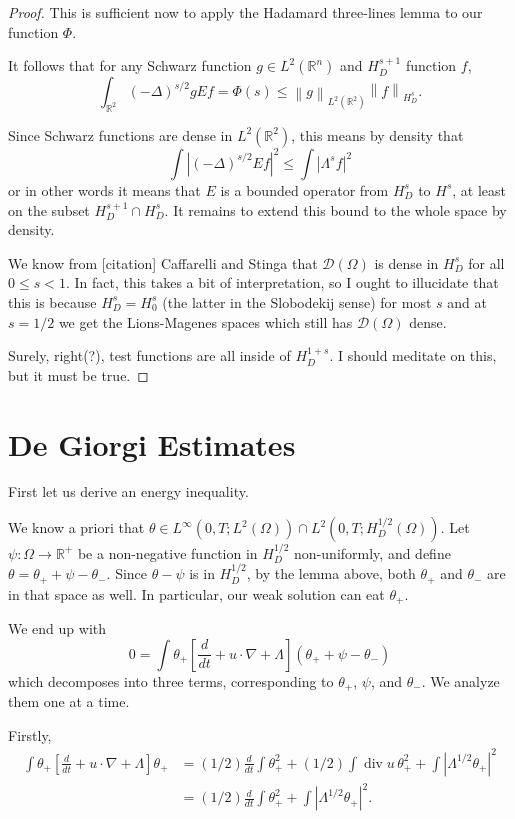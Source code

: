\documentclass[11pt]{amsart}
\theoremstyle{remark}
\newcommand{\R}{\mathbb{R}}
\newcommand{\norm}[1]{\left\lVert#1\right\rVert}
\newcommand{\paren}[1]{\left( #1 \right)}
\newcommand{\bracket}[1]{\left[ #1 \right]}
\newcommand{\abs}[1]{\left\lvert #1 \right\rvert}
\newcommand{\grad}{\nabla}
\newcommand{\ddt}{\frac{d}{dt}}
\renewcommand{\div}{\operatorname{div}}
\newcommand{\Laplace}{\Delta}
\newcommand{\test}{\mathcal{D}}
\begin{document}
\begin{proof}
This is sufficient now to apply the Hadamard three-lines lemma to our function $\Phi$.  

It follows that for any Schwarz function $g \in L^2(\R^n)$ and $H_D^{s+1}$ function $f$, 
\[ \int_{\R^2} \paren{-\Laplace}^{s/2} g E f = \Phi(s) \leq \norm{g}_{L^2(\R^2)} \norm{f}_{H_D^s}. \]

Since Schwarz functions are dense in $L^2(\R^2)$, this means by density that 
\[ \int \abs{ \paren{-\Laplace}^{s/2} E f }^2 \leq \int \abs{\Lambda^s f}^2 \]
or in other words it means that $E$ is a bounded operator from $H_D^s$ to $H^s$, at least on the subset $H_D^{s+1} \cap H_D^s$.  It remains to extend this bound to the whole space by density.  

We know from [citation] Caffarelli and Stinga that $\test(\Omega)$ is dense in $H_D^s$ for all $0 \leq s < 1$.  In fact, this takes a bit of interpretation, so I ought to illucidate that this is because $H_D^s = H_0^s$ (the latter in the Slobodekij sense) for most $s$ and at $s=1/2$ we get the Lions-Magenes spaces which still has $\test(\Omega)$ dense.  

Surely, right(?), test functions are all inside of $H_D^{1+s}$.  I should meditate on this, but it must be true.  
\end{proof}


\section{De Giorgi Estimates}

First let us derive an energy inequality.  

We know a priori that $\theta \in L^\infty(0,T; L^2(\Omega)) \cap L^2(0,T; H_D^{1/2}(\Omega))$.  Let $\psi: \Omega \to \R^+$ be a non-negative function in $H_D^{1/2}$ non-uniformly, and define $\theta = \theta_+ + \psi - \theta_-$.  Since $\theta - \psi$ is in $H_D^{1/2}$, by the lemma above, both $\theta_+$ and $\theta_-$ are in that space as well.  In particular, our weak solution can eat $\theta_+$.  

We end up with
\[ 0 = \int \theta_+ \bracket{ \ddt + u \cdot \grad + \Lambda } \paren{\theta_+ + \psi - \theta_-} \]
which decomposes into three terms, corresponding to $\theta_+$, $\psi$, and $\theta_-$.  We analyze them one at a time.  

Firstly,
\begin{align*} 
\int \theta_+ \bracket{ \ddt + u \cdot \grad + \Lambda } \theta_+ &= (1/2) \ddt \int \theta_+^2 + (1/2) \int \div u \, \theta_+^2 + \int \abs{\Lambda^{1/2} \theta_+}^2
\\ &= (1/2) \ddt \int \theta_+^2 + \int \abs{\Lambda^{1/2} \theta_+}^2.
\end{align*}
\end{document}
